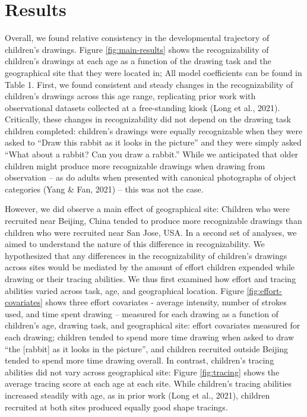 \documentclass[
  english,
  man]{apa6}
\begin{document}
\hypertarget{results}{%
\section{Results}\label{results}}

Overall, we found relative consistency in the developmental trajectory of children's drawings. Figure \ref{fig:main-results} shows the recognizability of children's drawings at each age as a function of the drawing task and the geographical site that they were located in; All model coefficients can be found in Table 1. First, we found consistent and steady changes in the recognizability of children's drawings across this age range, replicating prior work with observational datasets collected at a free-standing kiosk (Long et al., 2021). Critically, these changes in recognizability did not depend on the drawing task children completed: children's drawings were equally recognizable when they were asked to \enquote{Draw this rabbit as it looks in the picture} and they were simply asked \enquote{What about a rabbit? Can you draw a rabbit.} While we anticipated that older children might produce more recognizable drawings when drawing from observation -- as do adults when presented with canonical photographs of object categories (Yang \& Fan, 2021) -- this was not the case.

However, we did observe a main effect of geographical site: Children who were recruited near Beijing, China tended to produce more recognizable drawings than children who were recruited near San Jose, USA. In a second set of analyses, we aimed to understand the nature of this difference in recognizability. We hypothesized that any differences in the recognizability of children's drawings across sites would be mediated by the amount of effort children expended while drawing or their tracing abilities. We thus first examined how effort and tracing abilities varied across task, age, and geographical location. Figure \ref{fig:effort-covariates} shows three effort covariates - average intensity, number of strokes used, and time spent drawing -- measured for each drawing as a function of children's age, drawing task, and geographical site: effort covariates measured for each drawing; children tended to spend more time drawing when asked to draw \enquote{the {[}rabbit{]} as it looks in the picture}, and children recruited outside Beijing tended to spend more time drawing overall. In contrast, children's tracing abilities did not vary across geographical site: Figure \ref{fig:tracing} shows the average tracing score at each age at each site. While children's tracing abilities increased steadily with age, as in prior work (Long et al., 2021), children recruited at both sites produced equally good shape tracings.
\end{document}
